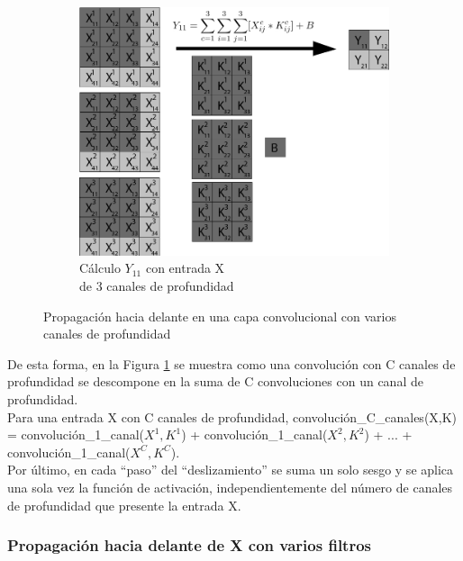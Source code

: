 \begin{figure}[H]
	\vspace{5mm}
	\begin{subfigure}{.5\textwidth}
		\hspace{-10mm}
		\includegraphics[width=1.2\linewidth]{imagenes/conv_1_3canales.jpg}  
		\caption{Cálculo $Y_{11}$ con entrada X \\ de 3 canales de profundidad}
	\end{subfigure}
	\caption{Propagación hacia delante en una capa convolucional con varios canales de profundidad}
	\label{fig:forward_prop_convolucional_canales_profundidad}
\end{figure}

De esta forma, en la Figura \ref{fig:forward_prop_convolucional_canales_profundidad} se muestra como una convolución con C canales de profundidad se descompone en la suma de C convoluciones con un canal de profundidad. \\ Para una entrada X con C canales de profundidad, convolución\_C\_canales(X,K) = convolución\_1\_canal($X^1,K^1$) + convolución\_1\_canal($X^2,K^2$) + ... + convolución\_1\_canal($X^C,K^C$). \\
Por último, en cada ``paso'' del ``deslizamiento'' se suma un solo sesgo y se aplica una sola vez la función de activación, independientemente del número de canales de profundidad que presente la entrada X.

\subsubsection{Propagación hacia delante de X con varios filtros}


